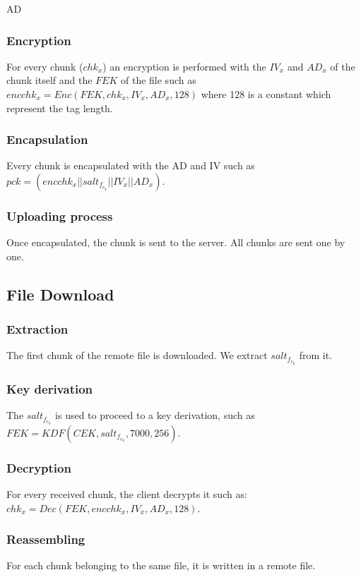 AD\documentclass[a4paper,10pt]{article}
\begin{document}
\subsubsection{Encryption}
For every chunk ($chk_x$) an encryption is performed with the $IV_x$ and $AD_x$ of the chunk
itself and the $FEK$ of the file such as $encchk_x=Enc(FEK, chk_x, IV_x, AD_x, 128)$ where 128
is a constant which represent the tag length.

\subsubsection{Encapsulation}
Every chunk is encapsulated with the AD and IV such as $pck=(encchk_x||salt_f_e_k||IV_x||AD_x)$.

\subsubsection{Uploading process}
Once encapsulated, the chunk is sent to the server. All chunks are sent one by one.


\subsection{File Download}

\subsubsection{Extraction}
The first chunk of the remote file is downloaded. We extract $salt_f_e_k$ from it.

\subsubsection{Key derivation}
The $salt_f_e_k$ is used to proceed to a key derivation, such as $FEK=KDF(CEK, salt_f_e_k, 7000, 256)$.

\subsubsection{Decryption}

For every received chunk, the client decrypts it such as: $chk_x=Dec(FEK, encchk_x, IV_x, AD_x, 128)$.

\subsubsection{Reassembling}
For each chunk belonging to the same file, it is written in a remote file.
\end{document}

